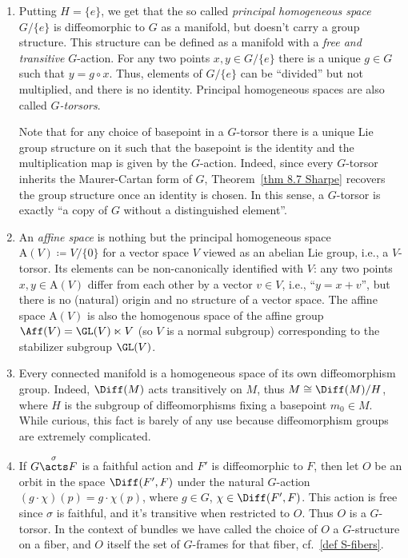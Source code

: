 \begin{example}\label{ex principal hom spaces}
    \begin{enumerate}
        \item Putting $H=\{e\}$, we get that the so called \emph{principal homogeneous space} $G\slash \{e\}$ is diffeomorphic to $G$ as a manifold, but doesn't carry a group structure. This structure can be defined as a manifold with a \emph{free and transitive} $G$-action. For any two points $x,y\in G\slash \{e\}$ there is a unique $g\in G$ such that $y=g\circ x$. Thus, elements of $G\slash\{e\}$ can be ``divided'' but not multiplied, and there is no identity. Principal homogeneous spaces are also called \emph{$G$-torsors}. 
        
        Note that for any choice of basepoint in a $G$-torsor there is a unique Lie group structure on it such that the basepoint is the identity and the multiplication map is given by the $G$-action. Indeed, since every $G$-torsor inherits the Maurer-Cartan form of $G$, Theorem~\ref{thm 8.7 Sharpe} recovers the group structure once an identity is chosen. In this sense, a $G$-torsor is exactly ``a copy of $G$ without a distinguished element''.
        
        \item An \emph{affine space} is nothing but the principal homogeneous space $\mathrm{A}(V)\coloneqq V\slash\{0\}$ for a vector space $V$ viewed as an abelian Lie group, i.e., a $V$-torsor. Its elements can be non-canonically identified with $V$: any two points $x,y\in \mathrm{A}(V)$ differ from each other by a vector $v\in V$, i.e., ``$y=x+v$'', but there is no (natural) origin and no structure of a vector space. The affine space $\mathrm{A}(V)$ is also the homogenous space of the affine group $\Aff(V)=\GL(V)\ltimes V$ (so $V$ is a normal subgroup) corresponding to the stabilizer subgroup $\GL(V)$.

        \item Every connected manifold is a homogeneous space of its own diffeomorphism group. Indeed, $\Diff(M)$ acts transitively on $M$, thus $M\cong \Diff(M)\slash H$, where $H$ is the subgroup of diffeomorphisms fixing a basepoint $m_0\in M$. While curious, this fact is barely of any use because diffeomorphism groups are extremely complicated.
        
        \item If $G\overset{\sigma}{\acts}F$ is a faithful action and $F'$ is diffeomorphic to $F$, then let $O$ be an orbit in the space $\Diff(F',F)$ under the natural $G$-action $(g\cdot \chi)(p)=g\cdot\chi(p)$, where $g\in G$, $\chi\in\Diff(F',F)$. This action is free since $\sigma$ is faithful, and it's transitive when restricted to $O$. Thus $O$ is a $G$-torsor. In the context of bundles we have called the choice of $O$ a $G$-structure on a fiber, and $O$ itself the set of $G$-frames for that fiber, cf.\ \ref{def S-fibers}.
    \end{enumerate}
\end{example}

